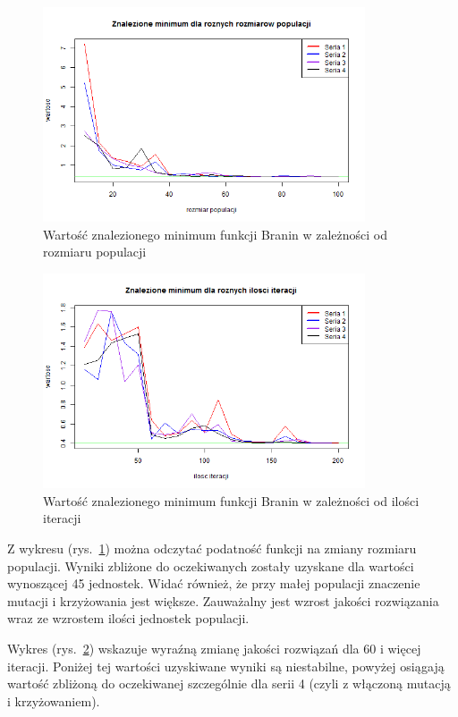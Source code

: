 \documentclass[11pt, a4paper]{article}
\newcommand{\fbi}{\leavevmode{\parindent=1em\indent}}
\begin{document}
\begin{figure}[H]
	\centering
	\includegraphics[width=0.85\textwidth]{./assets/Branin4.png}
	\caption{Wartość znalezionego minimum funkcji Branin w zależności od rozmiaru populacji}
	\label{fig:branin4}
\end{figure}

\begin{figure}[H]
	\centering
	\includegraphics[width=0.85\textwidth]{./assets/Branin5.png}
	\caption{Wartość znalezionego minimum funkcji Branin w zależności od ilości iteracji}
	\label{fig:branin5}
\end{figure}

\fbi
Z wykresu (rys.~\ref{fig:branin4}) można odczytać podatność funkcji na zmiany rozmiaru populacji. Wyniki zbliżone do oczekiwanych zostały uzyskane dla wartości wynoszącej 45 jednostek. Widać również, że przy małej populacji znaczenie mutacji i krzyżowania jest większe. Zauważalny jest wzrost jakości rozwiązania wraz ze wzrostem ilości jednostek populacji.

\fbi
Wykres (rys.~\ref{fig:branin5}) wskazuje wyraźną zmianę jakości rozwiązań dla 60 i więcej iteracji. Poniżej tej wartości uzyskiwane wyniki są niestabilne, powyżej osiągają wartość zbliżoną do oczekiwanej szczególnie dla serii 4 (czyli z włączoną mutacją i krzyżowaniem).
\end{document}
